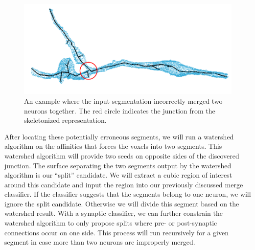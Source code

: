 \begin{figure}
	\centering
	\includegraphics[width=0.8\linewidth]{./figures/split-proposal.png}
	\caption{An example where the input segmentation incorrectly merged two neurons together. The red circle indicates the junction from the skeletonized representation.}
	\label{fig:proposal}
\end{figure}

After locating these potentially erroneous segments, we will run a watershed algorithm on the affinities that forces the voxels into two segments.
This watershed algorithm will provide two seeds on opposite sides of the discovered junction.
The surface separating the two segments output by the watershed algorithm is our ``split'' candidate.
We will extract a cubic region of interest around this candidate and input the region into our previously discussed merge classifier.
If the classifier suggests that the segments belong to one neuron, we will ignore the split candidate.
Otherwise we will divide this segment based on the watershed result.
With a synaptic classifier, we can further constrain the watershed algorithm to only propose splits where pre- or post-synaptic connections occur on one side.
This process will run recursively for a given segment in case more than two neurons are improperly merged.
